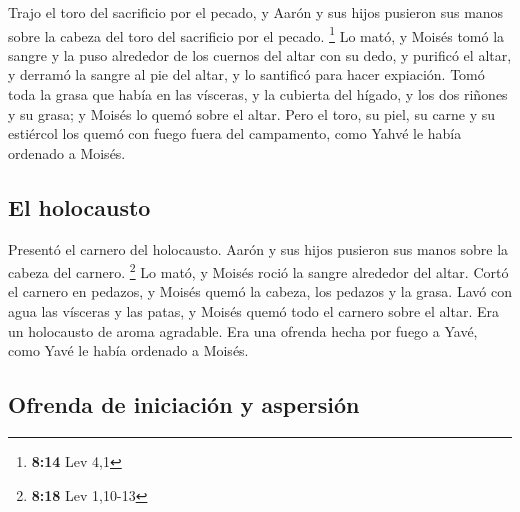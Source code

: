 \begin{paracol}{2}
 Trajo el toro del sacrificio por el pecado, y Aarón y
sus hijos pusieron sus manos sobre la cabeza del toro del sacrificio por
el pecado. \footnote{\textbf{8:14} Lev 4,1}  Lo mató, y
Moisés tomó la sangre y la puso alrededor de los cuernos del altar con
su dedo, y purificó el altar, y derramó la sangre al pie del altar, y lo
santificó para hacer expiación.  Tomó toda la grasa que
había en las vísceras, y la cubierta del hígado, y los dos riñones y su
grasa; y Moisés lo quemó sobre el altar.  Pero el toro,
su piel, su carne y su estiércol los quemó con fuego fuera del
campamento, como Yahvé le había ordenado a Moisés.

\hypertarget{el-holocausto}{%
\subsection{El holocausto}\label{el-holocausto}}

 Presentó el carnero del holocausto. Aarón y sus hijos
pusieron sus manos sobre la cabeza del carnero. \footnote{\textbf{8:18}
  Lev 1,10-13}  Lo mató, y Moisés roció la sangre
alrededor del altar.  Cortó el carnero en pedazos, y
Moisés quemó la cabeza, los pedazos y la grasa.  Lavó con
agua las vísceras y las patas, y Moisés quemó todo el carnero sobre el
altar. Era un holocausto de aroma agradable. Era una ofrenda hecha por
fuego a Yavé, como Yavé le había ordenado a Moisés.

\hypertarget{ofrenda-de-iniciaciuxf3n-y-aspersiuxf3n}{%
\subsection{Ofrenda de iniciación y
aspersión}\label{ofrenda-de-iniciaciuxf3n-y-aspersiuxf3n}}


\end{paracol}
